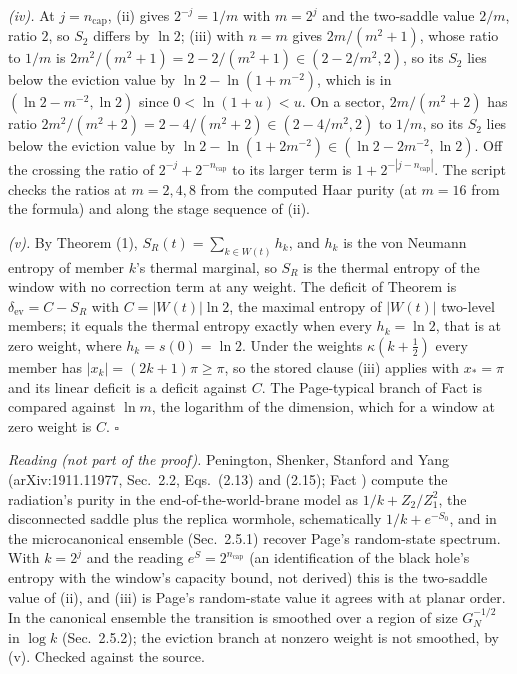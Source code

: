 \emph{(iv).} At $j = n_{\mathrm{cap}}$, (ii) gives $2^{-j} = 1/m$ with $m = 2^{j}$ and the two-saddle value $2/m$, ratio $2$, so $S_{2}$ differs by $\ln 2$; (iii) with $n = m$ gives $2m/(m^{2} + 1)$, whose ratio to $1/m$ is $2m^{2}/(m^{2} + 1) = 2 - 2/(m^{2} + 1) \in (2 - 2/m^{2}, 2)$, so its $S_{2}$ lies below the eviction value by $\ln 2 - \ln(1 + m^{-2})$, which is in $(\ln 2 - m^{-2}, \ln 2)$ since $0 < \ln(1 + u) < u$. On a sector, $2m/(m^{2} + 2)$ has ratio $2m^{2}/(m^{2} + 2) = 2 - 4/(m^{2} + 2) \in (2 - 4/m^{2}, 2)$ to $1/m$, so its $S_{2}$ lies below the eviction value by $\ln 2 - \ln(1 + 2m^{-2}) \in (\ln 2 - 2m^{-2}, \ln 2)$. Off the crossing the ratio of $2^{-j} + 2^{-n_{\mathrm{cap}}}$ to its larger term is $1 + 2^{-|j - n_{\mathrm{cap}}|}$. The script checks the ratios at $m = 2, 4, 8$ from the computed Haar purity (at $m = 16$ from the formula) and along the stage sequence of (ii).

\emph{(v).} By Theorem (1), $S_{R}(t) = \sum_{k \in W(t)}h_{k}$, and $h_{k}$ is the von Neumann entropy of member $k$'s thermal marginal, so $S_{R}$ is the thermal entropy of the window with no correction term at any weight. The deficit of Theorem  is $\delta_{\mathrm{ev}} = C - S_{R}$ with $C = |W(t)|\ln 2$, the maximal entropy of $|W(t)|$ two-level members; it equals the thermal entropy exactly when every $h_{k} = \ln 2$, that is at zero weight, where $h_{k} = s(0) = \ln 2$. Under the weights $\kappa(k + \tfrac12)$ every member has $|x_{k}| = (2k + 1)\pi \geq \pi$, so the stored clause (iii) applies with $x_{*} = \pi$ and its linear deficit is a deficit against $C$. The Page-typical branch of Fact  is compared against $\ln m$, the logarithm of the dimension, which for a window at zero weight is $C$. $\square$

\emph{Reading (not part of the proof).} Penington, Shenker, Stanford and Yang (arXiv:1911.11977, Sec.~2.2, Eqs.~(2.13) and (2.15); Fact ) compute the radiation's purity in the end-of-the-world-brane model as $1/k + Z_{2}/Z_{1}^{2}$, the disconnected saddle plus the replica wormhole, schematically $1/k + e^{-S_{0}}$, and in the microcanonical ensemble (Sec.~2.5.1) recover Page's random-state spectrum. With $k = 2^{j}$ and the reading $e^{S} = 2^{n_{\mathrm{cap}}}$ (an identification of the black hole's entropy with the window's capacity bound, not derived) this is the two-saddle value of (ii), and (iii) is Page's random-state value it agrees with at planar order. In the canonical ensemble the transition is smoothed over a region of size $G_{N}^{-1/2}$ in $\log k$ (Sec.~2.5.2); the eviction branch at nonzero weight is not smoothed, by (v). Checked against the source.
